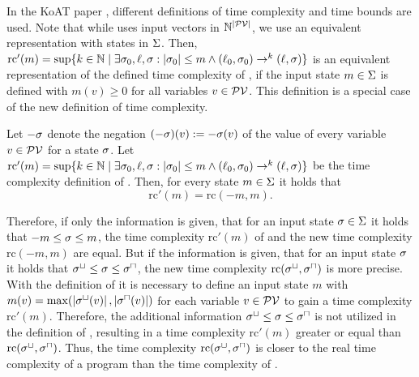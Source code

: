 In the KoAT paper \cite{koat}, different definitions of time complexity and time bounds are used.
Note that while \cite{koat} uses input vectors in $\mathbb{N}^{\left|\mathcal{PV}\right|}$, we use an equivalent representation with states in $\Sigma$.
Then, $\text{rc}'(m) = \sup \lbrace  k \in \mathbb{N} \mid \exists \sigma_0, \ell, \sigma: \left|\sigma_0\right| \leq m \wedge (\ell_0, \sigma_0) \rightarrow^k (\ell, \sigma)  \rbrace$ is an equivalent representation of the defined time complexity of \cite{koat}, if the input state $m \in \Sigma$ is defined with $m(v) \geq 0$ for all variables $v \in \mathcal{PV}$.
This definition is a special case of the new definition of time complexity.

\begin{remark}
  Let $-\sigma$ denote the negation $(-\sigma)(v) := -\sigma(v)$ of the value of every variable $v \in \mathcal{PV}$ for a state $\sigma$.
  Let $\text{rc}'(m) = \sup \lbrace  k \in \mathbb{N} \mid \exists \sigma_0, \ell, \sigma: \left|\sigma_0\right| \leq m \wedge (\ell_0, \sigma_0) \rightarrow^k (\ell, \sigma)  \rbrace$ be the time complexity definition of \cite{koat}.
  Then, for every state $m \in \Sigma$ it holds that
  \[ \text{rc}'(m) = \text{rc}(-m,m). \]
\end{remark}

Therefore, if only the information is given, that for an input state $\sigma \in \Sigma$ it holds that $-m \leq \sigma \leq m$, the time complexity $\text{rc}'(m)$ of \cite{koat} and the new time complexity $\text{rc}(-m,m)$ are equal.
But if the information is given, that for an input state $\sigma$ it holds that ${\sigma^\sqcup} \leq \sigma \leq {\sigma^\sqcap}$, the new time complexity $\text{rc}({\sigma^\sqcup}, {\sigma^\sqcap})$ is more precise.
With the definition of \cite{koat} it is necessary to define an input state $m$ with $m(v) = \max(\left|{\sigma^\sqcup}(v)\right|, \left|{\sigma^\sqcap}(v)\right|)$ for each variable $v \in \mathcal{PV}$ to gain a time complexity $\text{rc}'(m)$.
Therefore, the additional information ${\sigma^\sqcup} \leq \sigma \leq {\sigma^\sqcap}$ is not utilized in the definition of \cite{koat}, resulting in a time complexity $\text{rc}'(m)$ greater or equal than $\text{rc}({\sigma^\sqcup}, {\sigma^\sqcap})$.
Thus, the time complexity $\text{rc}({\sigma^\sqcup}, {\sigma^\sqcap})$ is closer to the real time complexity of a program than the time complexity of \cite{koat}.

